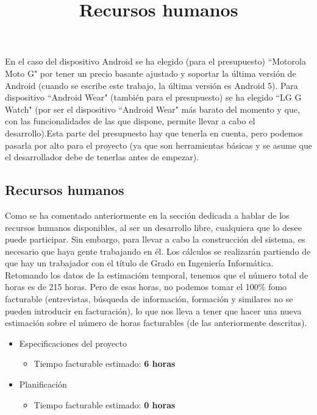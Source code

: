 En el caso del dispositivo Android se ha elegido (para el presupuesto) ``Motorola Moto G" por tener
un precio basante ajustado y soportar la última versión de Android (cuando se escribe este
trabajo, la última versión es Android 5). Para dispositivo ``Android Wear" (también para el presupuesto)
se ha elegido ``LG G Watch" (por ser el dispositivo ``Android Wear" más barato del momento
y que, con las funcionalidades de las que dispone, permite llevar a cabo el desarrollo).Esta
parte del presupuesto hay que tenerla en cuenta, pero podemos pasarla por alto para el proyecto
(ya que son herramientas básicas y se asume que el desarrollador debe de tenerlas antes de empezar).\\

\subsection{Recursos humanos}
\title{Recursos humanos}

Como se ha comentado anteriormente en la sección dedicada a hablar de los recursos humanos disponibles,
al ser un desarrollo libre, cualquiera que lo desee puede participar. Sin embargo, para llevar a cabo la
construcción del sistema, es necesario que haya gente trabajando en él. Los cálculos
se realizarán partiendo de que hay un trabajador con el título de Grado en Ingeniería Informática.\\

Retomando los datos de la estimacióm temporal, tenemos que el número total de horas es
de 215 horas. Pero de esas horas, no podemos tomar el 100\% fomo facturable (entrevistas,
búsqueda de información, formación y similares no se pueden introducir en facturación),
lo que nos lleva a tener que hacer una nueva estimación sobre el número de horas facturables
(de las anteriormente descritas).\\


\begin{itemize}
  \item Especificaciones del proyecto
  \begin{itemize}
    \item{Tiempo facturable estimado: \textbf{6 horas}}
  \end{itemize}
\end{itemize}

\begin{itemize}
  \item Planificación
  \begin{itemize}
    \item{Tiempo facturable estimado: \textbf{0 horas}}
  \end{itemize}
\end{itemize}

